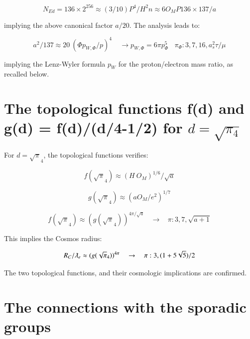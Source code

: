 \documentclass[a4paper,9pt]{article}
\begin{document}
\begin{equation}
N_{Ed} = 136 \times 2^{256} \approx (3/10) P^4/H^2 n \approx 6 O_M P 136\times 137/a
\end{equation} 

implying the above canonical factor $a/20$. The analysis leads to:
 
 \begin{equation}
a^2/137 \approx 20 ~ (\Phi p_{W,\Phi}/p)^4   ~~~~~ \rightarrow  p_{W,\Phi} = 6\pi p_{\Phi}^5  ~~~~ \pi_{\Phi} : 3,7,16,a_s^2\tau/\mu  
\end{equation}  
 
implying the Lenz-Wyler formula $p_W$ for the proton/electron mass ratio, as recalled below.






 
\section{The topological functions f(d) and g(d) = f(d)/(d/4-1/2) for $d = \sqrt {\pi_4}$}

For $d = \sqrt\pi_4$, the topological functions verifies:

\begin{equation}
f(\sqrt\pi_4) \approx (H~O_M)^{1/6}/\sqrt a  
\end{equation} 

\begin{equation}
g(\sqrt\pi_4) \approx (aO_M/e^2)^{1/7}  
\end{equation} 


\begin{equation}
f(\sqrt\pi_4) \approx (g(\sqrt\pi_4))^{4\pi/\sqrt a}  ~~~~\rightarrow ~~~~ \pi : 3,7,\sqrt{a+1}
\end{equation} 

This implies the Cosmos radius:

\begin{equation}
R_C/\lambdabar_e \approx (g(\sqrt\pi_4))^{4\pi}  ~~~~\rightarrow ~~~~  \pi : 3,(1+5\sqrt 5)/2
\end{equation} 

The two topological functions, and their cosmologic implications are confirmed.







 
 \section{The connections with the sporadic groups }
\end{document}
